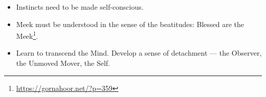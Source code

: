 \begin{itemize}
\item Instincts need to be made self-conscious. 
\item Meek must be understood in the sense of the beatitudes: Blessed are the Meek\footnote{\url{https://gornahoor.net/?p=359}}. 
\item Learn to transcend the Mind. Develop a sense of detachment — the Observer, the Unmoved Mover, the Self. 
\end{itemize}


